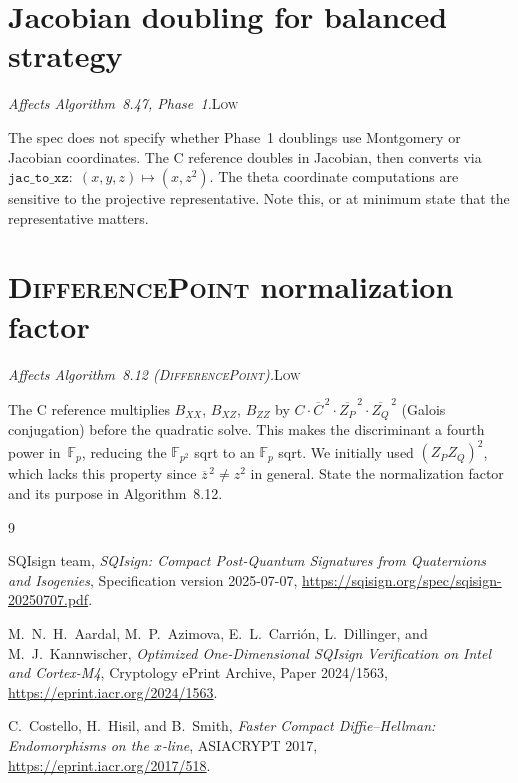 \documentclass[a4paper,11pt]{article}
\newcommand{\algo}[1]{Algorithm~#1}
\newcommand{\Fp}{\mathbb{F}_p}
\newcommand{\Fpii}{\mathbb{F}_{p^2}}
\newcommand{\low}{\textsc{\color{OliveGreen}Low}}
\newcommand{\finding}[2]{\noindent\textit{#1}\hfill#2\par\smallskip}
\begin{document}
\section{Jacobian doubling for balanced strategy}
\label{sec:jacobian-doubling}

\finding{Affects \algo{8.47}, Phase~1.}{\low}

The spec does not specify whether Phase~1 doublings use Montgomery or
Jacobian coordinates.  The C reference doubles in Jacobian, then converts
via $\texttt{jac\_to\_xz}{:}\; (x,y,z) \mapsto (x, z^2)$.  The theta
coordinate computations are sensitive to the projective representative.
Note this, or at minimum state that the representative matters.

\section{\textsc{DifferencePoint} normalization factor}
\label{sec:difference-normalization}

\finding{Affects \algo{8.12} (\textsc{DifferencePoint}).}{\low}

The C reference multiplies $B_{XX}$, $B_{XZ}$, $B_{ZZ}$ by
$C \cdot \overline{C}^{\,2} \cdot \overline{Z_P}^{\,2} \cdot
\overline{Z_Q}^{\,2}$ (Galois conjugation) before the quadratic solve.
This makes the discriminant a fourth power in~$\Fp$, reducing the
$\Fpii$ sqrt to an $\Fp$ sqrt.  We initially used $(Z_P Z_Q)^2$, which
lacks this property since $\overline{z}^{\,2} \neq z^2$ in general.
State the normalization factor and its purpose in \algo{8.12}.


\begin{thebibliography}{9}

{SQIsign team},
\textit{SQIsign: Compact Post-Quantum Signatures from Quaternions and Isogenies},
Specification version 2025-07-07,
\url{https://sqisign.org/spec/sqisign-20250707.pdf}.

M.~N.~H.~Aardal, M.~P.~Azimova, E.~L.~Carri\'{o}n, L.~Dillinger, and
M.~J.~Kannwischer,
\textit{Optimized One-Dimensional SQIsign Verification on Intel and Cortex-M4},
Cryptology ePrint Archive, Paper 2024/1563,
\url{https://eprint.iacr.org/2024/1563}.

C.~Costello, H.~Hisil, and B.~Smith,
\textit{Faster Compact Diffie--Hellman: Endomorphisms on the $x$-line},
ASIACRYPT 2017,
\url{https://eprint.iacr.org/2017/518}.

\end{thebibliography}
\end{document}
